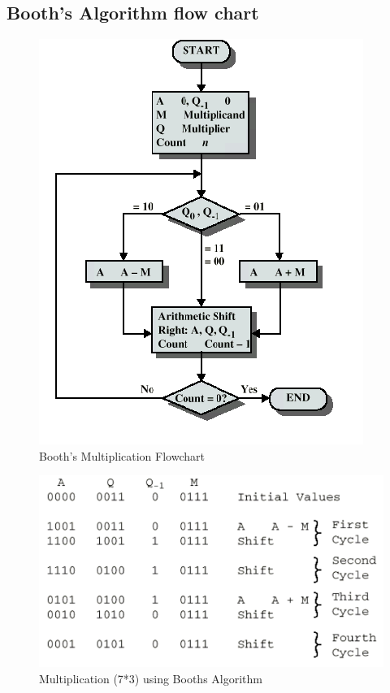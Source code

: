\documentclass[10pt,a4paper]{article}
\begin{document}
\subsection{Booth's Algorithm flow chart}
	\begin{figure}[h!]
		\centering
		\includegraphics[scale=0.60]{booth}
		\caption{Booth's Multiplication Flowchart}
	\end{figure}

	\begin{figure}[htb]
		\centering
		\includegraphics[scale = 0.60]{boothex}
		\caption{ Multiplication (7*3) using Booths Algorithm}
	\end{figure}
\end{document}
